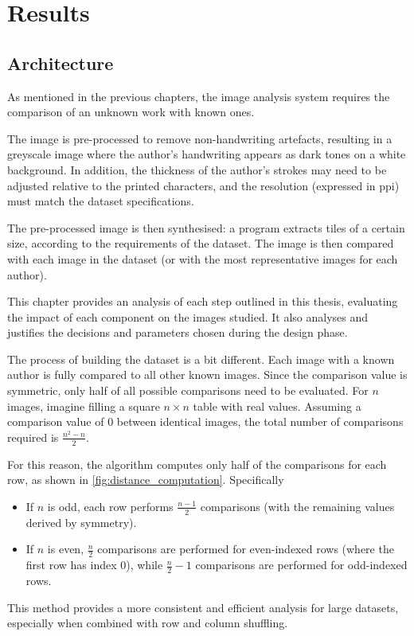\chapter{Results}
\begin{toReview}
\section{Architecture}
	As mentioned in the previous chapters, the image analysis system requires the comparison of an unknown work with known ones.

	\noindent The image is pre-processed to remove non-handwriting artefacts, resulting in a greyscale image where the author's handwriting appears as dark tones on a white background. In addition, the thickness of the author's strokes may need to be adjusted relative to the printed characters, and the resolution (expressed in \gls{ppi}) must match the dataset specifications.

	\noindent The pre-processed image is then synthesised: a program extracts tiles of a certain size, according to the requirements of the dataset. The image is then compared with each image in the dataset (or with the most representative images for each author).

	\noindent This chapter provides an analysis of each step outlined in this thesis, evaluating the impact of each component on the images studied. It also analyses and justifies the decisions and parameters chosen during the design phase.

	\bigskip
	\noindent The process of building the dataset is a bit different. Each image with a known author is fully compared to all other known images. Since the comparison value is symmetric, only half of all possible comparisons need to be evaluated. For $n$ images, imagine filling a square $n\times n$ table with real values. Assuming a comparison value of $0$ between identical images, the total number of comparisons required is $\frac{n^2-n}{2}$.

	\noindent For this reason, the algorithm computes only half of the comparisons for each row, as shown in \cref{fig:distance_computation}. Specifically
	\begin{itemize}
		\item If $n$ is odd, each row performs $\frac{n-1}{2}$ comparisons (with the remaining values derived by symmetry).
		\item If $n$ is even, $\frac{n}2$ comparisons are performed for even-indexed rows (where the first row has index $0$), while $\frac{n}2-1$ comparisons are performed for odd-indexed rows.
	\end{itemize}
	\noindent This method provides a more consistent and efficient analysis for large datasets, especially when combined with row and column shuffling.


\end{toReview}
